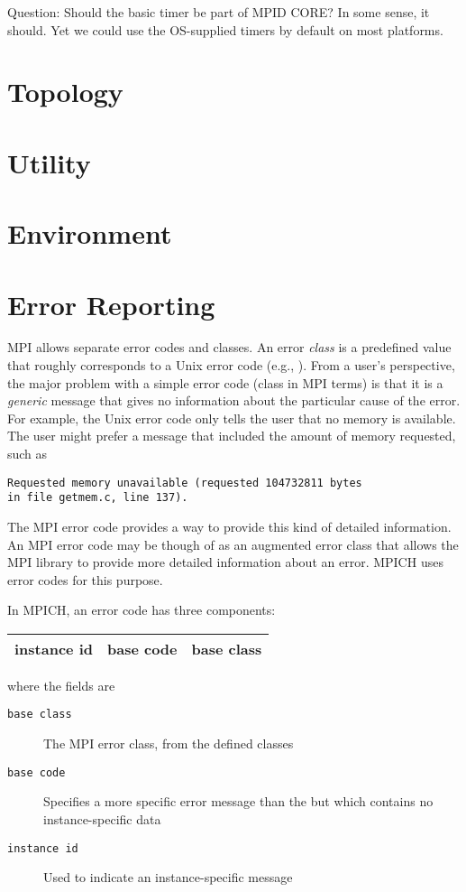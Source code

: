 \documentclass{article}
\begin{document}
Question: Should the basic timer be part of MPID CORE?  In some sense, it
should.  Yet we could use the OS-supplied timers by default on most platforms.



\section{Topology}



\section{Utility}

 

\section{Environment}


\section{Error Reporting}
MPI allows separate error codes and classes.  An error \emph{class} is
a predefined value that roughly corresponds to a Unix error code
(e.g., ).  From a user's perspective, the major problem
with a simple error code (class in MPI terms) is that it is a
\emph{generic} message that gives no information about the particular
cause of the error.  For example, the Unix error code 
only tells the user that no memory is available.  The user might
prefer a message that included the amount of memory requested, such as 
\begin{verbatim}
Requested memory unavailable (requested 104732811 bytes 
in file getmem.c, line 137).
\end{verbatim}
The MPI error code provides a way to provide this kind of detailed
information.  An MPI error code may be though of as an
augmented error class that allows the MPI library to provide more
detailed information about an error.  MPICH uses error codes for this
purpose.  

In MPICH, an error code has three components:

\begin{center}
\begin{tabular}{|c|c|c|}
\hline
instance id&base code&base class\\
\hline
\end{tabular}
\end{center}
where the fields are
\begin{description}
\item[\texttt{base class}]The MPI error class, from the defined classes
\item[\texttt{base code}]Specifies a more specific error message than
the  but which contains no instance-specific data
\item[\texttt{instance id}]Used to indicate an instance-specific message
\end{description}
\end{document}

